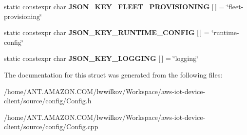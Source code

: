 \begin{DoxyCompactItemize}
static constexpr char {\bfseries J\+S\+O\+N\+\_\+\+K\+E\+Y\+\_\+\+F\+L\+E\+E\+T\+\_\+\+P\+R\+O\+V\+I\+S\+I\+O\+N\+I\+NG} \mbox{[}$\,$\mbox{]} = \char`\"{}fleet-\/provisioning\char`\"{}
\item 
\mbox{\label{struct_aws_1_1_iot_1_1_device_client_1_1_plain_config_a835132c6f3880fad1b2f5677c0dc7c01}} 
static constexpr char {\bfseries J\+S\+O\+N\+\_\+\+K\+E\+Y\+\_\+\+R\+U\+N\+T\+I\+M\+E\+\_\+\+C\+O\+N\+F\+IG} \mbox{[}$\,$\mbox{]} = \char`\"{}runtime-\/config\char`\"{}
\item 
\mbox{\label{struct_aws_1_1_iot_1_1_device_client_1_1_plain_config_adde6d544fcec7cc47356908c751b6d16}} 
static constexpr char {\bfseries J\+S\+O\+N\+\_\+\+K\+E\+Y\+\_\+\+L\+O\+G\+G\+I\+NG} \mbox{[}$\,$\mbox{]} = \char`\"{}logging\char`\"{}
\end{DoxyCompactItemize}


The documentation for this struct was generated from the following files\+:\begin{DoxyCompactItemize}
\item 
/home/\+A\+N\+T.\+A\+M\+A\+Z\+O\+N.\+C\+O\+M/lwwilkov/\+Workspace/aws-\/iot-\/device-\/client/source/config/Config.\+h\item 
/home/\+A\+N\+T.\+A\+M\+A\+Z\+O\+N.\+C\+O\+M/lwwilkov/\+Workspace/aws-\/iot-\/device-\/client/source/config/Config.\+cpp\end{DoxyCompactItemize}
